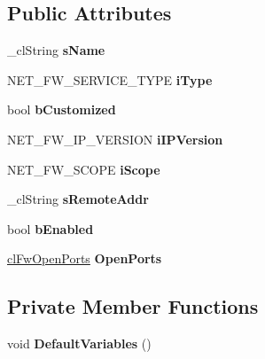 \subsection*{Public Attributes}
\begin{DoxyCompactItemize}
\item 
\hypertarget{classcl_fw_service_a79c1a106723c624a2441c9e48dc65e68}{
\_\-clString {\bfseries sName}}
\label{classcl_fw_service_a79c1a106723c624a2441c9e48dc65e68}

\item 
\hypertarget{classcl_fw_service_ae3f073f03516838662f949f91c0527fd}{
NET\_\-FW\_\-SERVICE\_\-TYPE {\bfseries iType}}
\label{classcl_fw_service_ae3f073f03516838662f949f91c0527fd}

\item 
\hypertarget{classcl_fw_service_a3362f803697299840b6faea12e11ace2}{
bool {\bfseries bCustomized}}
\label{classcl_fw_service_a3362f803697299840b6faea12e11ace2}

\item 
\hypertarget{classcl_fw_service_a8e7afc6c932b9c88f69f561ebd991629}{
NET\_\-FW\_\-IP\_\-VERSION {\bfseries iIPVersion}}
\label{classcl_fw_service_a8e7afc6c932b9c88f69f561ebd991629}

\item 
\hypertarget{classcl_fw_service_aa1e3940ef1288ad88a2bb0220a51dc03}{
NET\_\-FW\_\-SCOPE {\bfseries iScope}}
\label{classcl_fw_service_aa1e3940ef1288ad88a2bb0220a51dc03}

\item 
\hypertarget{classcl_fw_service_a6f2eac74d0ebdb1317514cb700d285a5}{
\_\-clString {\bfseries sRemoteAddr}}
\label{classcl_fw_service_a6f2eac74d0ebdb1317514cb700d285a5}

\item 
\hypertarget{classcl_fw_service_a71e5666471c8fde5835dc37faaa95f34}{
bool {\bfseries bEnabled}}
\label{classcl_fw_service_a71e5666471c8fde5835dc37faaa95f34}

\item 
\hypertarget{classcl_fw_service_af7b319b5926aa118069e54b5d40d5bdb}{
\hyperlink{classcl_fw_open_ports}{clFwOpenPorts} {\bfseries OpenPorts}}
\label{classcl_fw_service_af7b319b5926aa118069e54b5d40d5bdb}

\end{DoxyCompactItemize}
\subsection*{Private Member Functions}
\begin{DoxyCompactItemize}
\item 
\hypertarget{classcl_fw_service_a1719fd079791c9c46a807faed7a24a2a}{
void {\bfseries DefaultVariables} ()}
\label{classcl_fw_service_a1719fd079791c9c46a807faed7a24a2a}

\end{DoxyCompactItemize}
